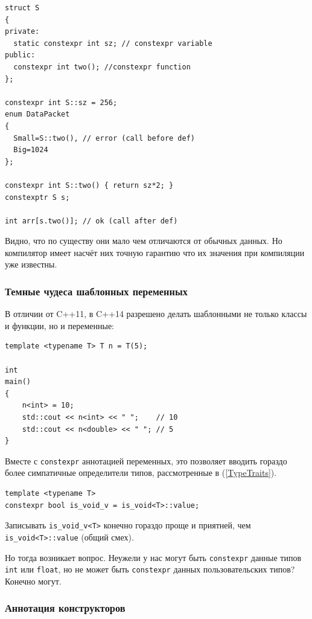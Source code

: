 \documentclass[a4paper,12pt,oneside]{article}
\begin{document}
\begin{lstlisting}
struct S
{
private:
  static constexpr int sz; // constexpr variable
public:
  constexpr int two(); //constexpr function
};

constexpr int S::sz = 256;
enum DataPacket
{
  Small=S::two(), // error (call before def)  
  Big=1024
};

constexpr int S::two() { return sz*2; }
constexptr S s;

int arr[s.two()]; // ok (call after def)
\end{lstlisting}

Видно, что по существу они мало чем отличаются от обычных данных. Но компилятор имеет насчёт них точную гарантию что их значения при компиляции уже известны.

\subsubsection{Темные чудеса шаблонных переменных}\label{Constexpr:templatevars}

В отличии от C++11, в C++14 разрешено делать шаблонными не только классы и функции, но и переменные:

\begin{lstlisting}
template <typename T> T n = T(5);

int 
main()
{
    n<int> = 10;
    std::cout << n<int> << " ";    // 10
    std::cout << n<double> << " "; // 5
}
\end{lstlisting}

Вместе с \lstinline!constexpr! аннотацией переменных, это позволяет вводить гораздо более симпатичные определители типов, рассмотренные в (\ref{TypeTraits}).

\begin{lstlisting}
template <typename T> 
constexpr bool is_void_v = is_void<T>::value;
\end{lstlisting}

Записывать \lstinline!is_void_v<T>! конечно гораздо проще и приятней, чем \lstinline!is_void<T>::value! (общий смех).

Но тогда возникает вопрос. Неужели у нас могут быть \lstinline!constexpr! данные типов \lstinline!int! или \lstinline!float!, но не может быть \lstinline!constexpr! данных пользовательских типов? Конечно могут.

\subsubsection{Аннотация конструкторов}\label{Constexpr:ctors}
\end{document}
